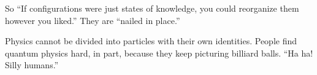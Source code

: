 So ``If configurations were just states of knowledge, you could reorganize them however you liked.'' They are ``nailed in place.'' 

Physics cannot be divided into particles with their own identities. People find quantum physics hard, in part, because they keep picturing billiard balls. ``Ha ha! Silly humans.''
